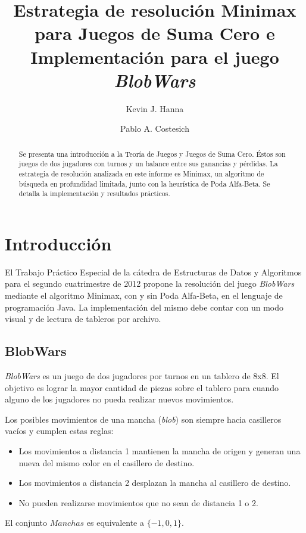 \documentclass[10pt,a4paper,notitlepage,twocolumn,draft]{article}
\author[1]{\rm Kevin J. Hanna}
\author[2]{\rm Pablo A. Costesich}
\affil[ ]{Alumnos de Ingeniería Informática}
\affil[ ]{Instituto Tecnológico de Buenos Aires}
\affil[ ]{Av. Madero 399, C.A.B.A., Argentina}
\affil[1]{\textit {khanna@alu.itba.edu.ar}}
\affil[2]{\textit {pcostesi@ieee.org}}
\title{Estrategia de resolución Minimax para Juegos de Suma Cero e Implementación para el juego \textit {BlobWars}}
\newenvironment{definition}[1][Definición]{\begin{trivlist}
\item[\hskip \labelsep {\bfseries #1}]}{\end{trivlist}}
\begin{document}
\maketitle
\begin{abstract}
Se presenta una introducción a la Teoría de Juegos y Juegos de Suma Cero. Éstos son juegos de dos jugadores con turnos y un balance entre sus ganancias y pérdidas. La estrategia de resolución analizada en este informe es Minimax, un algoritmo de búsqueda en profundidad limitada, junto con la heurística de Poda Alfa-Beta. Se detalla la implementación y resultados prácticos.
\end{abstract}

\section{Introducción}
El Trabajo Práctico Especial de la cátedra de Estructuras de Datos y Algoritmos para el segundo cuatrimestre de 2012 propone la resolución del juego \textit{BlobWars} mediante el algoritmo Minimax, con y sin Poda Alfa-Beta, en el lenguaje de programación Java. La implementación del mismo debe contar con un modo visual y de lectura de tableros por archivo.


\subsection{BlobWars}
\textit{BlobWars} es un juego de dos jugadores por turnos en un tablero de 8x8. El objetivo es lograr la mayor cantidad de piezas sobre el tablero para cuando alguno de los jugadores no pueda realizar nuevos movimientos.

Los posibles movimientos de una mancha (\textit{blob}) son siempre hacia casilleros vacíos y cumplen estas reglas:
\begin{itemize}
\item Los movimientos a distancia 1 mantienen la mancha de origen y generan una nueva del mismo color en el casillero de destino.
\item Los movimientos a distancia 2 desplazan la mancha al casillero de destino.
\item No pueden realizarse movimientos que no sean de distancia 1 o 2.
\end{itemize}

\begin{definition}
El conjunto $Manchas$ es equivalente a $\{-1, 0, 1\}$.
\end{definition}
\end{document}
